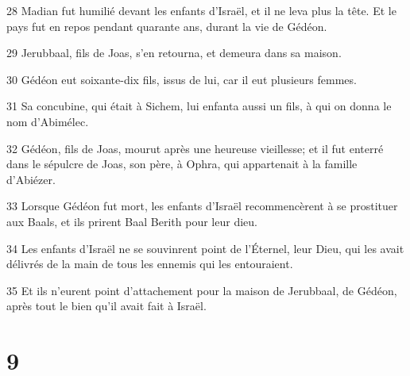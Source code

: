 \par 28 Madian fut humilié devant les enfants d'Israël, et il ne leva plus la tête. Et le pays fut en repos pendant quarante ans, durant la vie de Gédéon.
\par 29 Jerubbaal, fils de Joas, s'en retourna, et demeura dans sa maison.
\par 30 Gédéon eut soixante-dix fils, issus de lui, car il eut plusieurs femmes.
\par 31 Sa concubine, qui était à Sichem, lui enfanta aussi un fils, à qui on donna le nom d'Abimélec.
\par 32 Gédéon, fils de Joas, mourut après une heureuse vieillesse; et il fut enterré dans le sépulcre de Joas, son père, à Ophra, qui appartenait à la famille d'Abiézer.
\par 33 Lorsque Gédéon fut mort, les enfants d'Israël recommencèrent à se prostituer aux Baals, et ils prirent Baal Berith pour leur dieu.
\par 34 Les enfants d'Israël ne se souvinrent point de l'Éternel, leur Dieu, qui les avait délivrés de la main de tous les ennemis qui les entouraient.
\par 35 Et ils n'eurent point d'attachement pour la maison de Jerubbaal, de Gédéon, après tout le bien qu'il avait fait à Israël.

\chapter{9}

